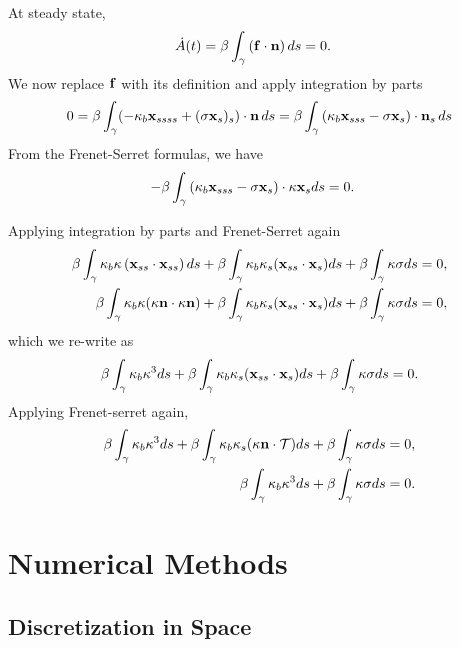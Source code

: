 \documentclass[aps,prl,showpacs]{revtex4}
\begin{document}
At steady state,
\begin{align}
    \dot{A}(t) &= \beta \int_{\gamma}\left(\mathbf{f}\cdot\mathbf{n}\right)ds =0.
\end{align}
We now replace $\mathbf{f}$ with its definition and apply integration by parts
\begin{align}
   0=\beta\int_{\gamma} 
    (-\kappa_b\mathbf{x}_{ssss}+(\sigma\mathbf{x}_s)_s)\cdot\mathbf{n}\, ds =
   \beta\int_{\gamma}\left(\kappa_b\mathbf{x}_{sss}-\sigma\mathbf{x}_s\right)\cdot
     \mathbf{n}_s\, ds
\end{align}
From the Frenet-Serret formulas, we have 
\begin{align}
     -\beta\int_{\gamma}
     \left(\kappa_b\mathbf{x}_{sss}-\sigma\mathbf{x}_s\right)\cdot\kappa\mathbf{x}_s ds &=0.
\end{align}

Applying integration by parts and Frenet-Serret again
\begin{align}
     \beta\int_{\gamma}
     \kappa_b\kappa\left(\mathbf{x}_{ss}\cdot\mathbf{x}_{ss}\right)ds + \beta
     \int_{\gamma} \kappa_b \kappa_s(\mathbf{x}_{ss} \cdot \mathbf{x}_s)ds +\beta\int_{\gamma}\kappa\sigma ds  &= 0,\\
    \beta\int_{\gamma} \kappa_b\kappa(\kappa\mathbf{n} \cdot
     \kappa\mathbf{n})+ \beta \int_{\gamma} \kappa_b \kappa_s(\mathbf{x}_{ss} \cdot
     \mathbf{x}_s)ds +\beta\int_{\gamma}\kappa\sigma ds &= 0,
\end{align}
which we re-write as
\begin{align}
   \beta\int_{\gamma}\kappa_b\kappa^3 ds + \beta \int_{\gamma} \kappa_b
   \kappa_s(\mathbf{x}_{ss} \cdot \mathbf{x}_s)ds +\beta\int_{\gamma} \kappa\sigma ds = 0.
\end{align}
Applying Frenet-serret again,
\begin{align}
    \beta\int_{\gamma}\kappa_b\kappa^3 ds + \beta \int_{\gamma} \kappa_b
    \kappa_s(\kappa\mathbf{n} \cdot \mathcal{T})ds +\beta\int_{\gamma} \kappa\sigma ds = 0, \\
    \beta\int_{\gamma}\kappa_b\kappa^3 ds +\beta\int_{\gamma} \kappa\sigma ds  = 0.
\end{align}


\section{Numerical Methods}
\subsection{Discretization in Space}
\end{document}
